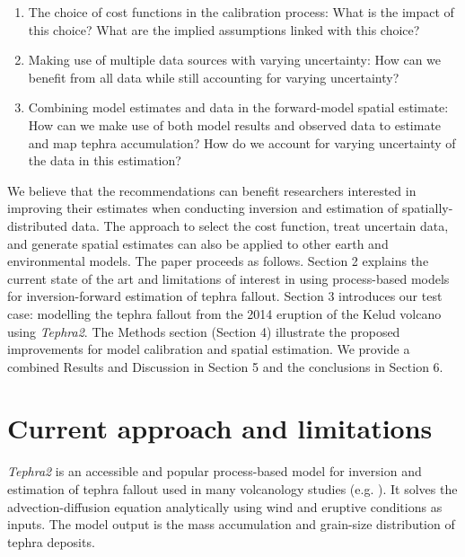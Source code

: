 \documentclass[a4paper,fleqn]{cas-sc}
\begin{document}
\begin{enumerate}
    \item The choice of cost functions in the calibration process: What is the impact of this choice? What are the implied assumptions linked with this choice?
    \item Making use of multiple data sources with varying uncertainty: How can we benefit from all data while still accounting for varying uncertainty?
    \item Combining model estimates and data in the forward-model spatial estimate: How can we make use of both model results and observed data to estimate and map tephra accumulation? How do we account for varying uncertainty of the data in this estimation?
\end{enumerate}

We believe that the recommendations can benefit researchers interested in improving their estimates when conducting inversion and estimation of spatially-distributed data. The approach to select the cost function, treat uncertain data, and generate spatial estimates can also be applied to other earth and environmental models. The paper proceeds as follows. Section 2 explains the current state of the art and limitations of interest in using process-based models for inversion-forward estimation of tephra fallout. Section 3 introduces our test case: modelling the tephra fallout from the 2014 eruption of the Kelud volcano using \textit{Tephra2}. The Methods section (Section 4) illustrate the proposed improvements for model calibration and spatial estimation. We provide a combined Results and Discussion in Section 5 and the conclusions in Section 6.


    
\section{Current approach and limitations} \label{section-calibration}

\textit{Tephra2} is an accessible and popular process-based model for inversion \citep{connor2006inversion} and estimation of tephra fallout used in many volcanology studies (e.g. \citet{volentik2010modeling, costa2012, bonadonna2013, mannen2014, bonadonna2015, connor2019, constantinescu2021, williams2020}). It solves the advection-diffusion equation analytically using wind and eruptive conditions as inputs. The model output is the mass accumulation and grain-size distribution of tephra deposits.
\end{document}

